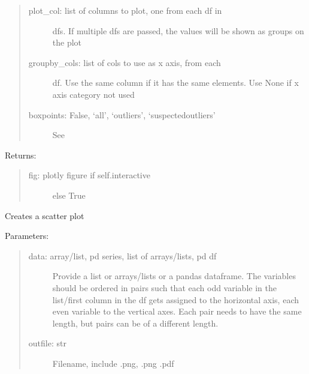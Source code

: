 \documentclass[letterpaper,10pt,english,openany]{sphinxmanual}
\begin{document}
\begin{fulllineitems}
\begin{fulllineitems}
\begin{quote}
\begin{description}
\item[{plot\_col: list of columns to plot, one from each df in}] \leavevmode
dfs. If multiple dfs are passed, the values will be
shown as groups on the plot

\item[{groupby\_cols: list of cols to use as x axis, from each}] \leavevmode
df. Use the same column if it has the same elements.
Use None if x axis category not used

\item[{boxpoints: False, ‘all’, ‘outliers’, ‘suspectedoutliers’}] \leavevmode
See 

\end{description}
\end{quote}

Returns:
\begin{quote}
\begin{description}
\item[{fig: plotly figure if self.interactive}] \leavevmode
else True

\end{description}
\end{quote}

\end{fulllineitems}


\begin{fulllineitems}
\label{\detokenize{source/mswh.tools:mswh.tools.plots.Plot.scatter}}
Creates a scatter plot

Parameters:
\begin{quote}
\begin{description}
\item[{data: array/list, pd series, list of arrays/lists, pd df}] \leavevmode
Provide a list or arrays/lists or a pandas dataframe.
The variables should be ordered in pairs such that
each odd variable in the list/first column in the df
gets assigned to the horizontal axis, each even
variable to the vertical axes. Each pair needs
to have the same length, but pairs can be of
a different length.

\item[{outfile: str}] \leavevmode
Filename, include .png, .png .pdf


\end{description}
\end{quote}
\end{fulllineitems}
\end{fulllineitems}
\end{document}
